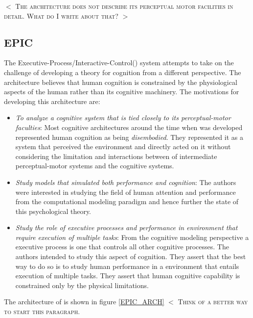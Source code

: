$<$ \textsc{The \soar architecture does not describe its perceptual
  motor facilities in detail. What do I write about that?} $>$


\subsection{EPIC}
The Executive-Process/Interactive-Control(\epic) system attempts to
take on the challenge of developing a theory for cognition from a
different perspective. The \epic architecture believes that human
cognition is constrained by the physiological aspects of the human
rather than its cognitive machinery. The motivations for developing
this architecture are:

\begin{itemize}
\item \emph{To analyze a cognitive system that is tied closely to its
    perceptual-motor faculties}: Most cognitive architectures around
  the time when \epic was developed represented human cognition as
  being \emph{disembodied}. They represented it as a system that
  perceived the environment and directly acted on it without
  considering the limitation and interactions between of intermediate
  perceptual-motor systems and the cognitive systems.
\item \emph{Study models that simulated both performance and
    cognition}: The authors were interested in studying the field of
  human attention and performance from the computational modeling
  paradigm and hence further the state of this psychological theory.
\item \emph{Study the role of executive processes and performance in
    environment that require execution of multiple tasks}: From the
  cognitive modeling perspective a executive process is one that
  controls all other cognitive processes. The authors intended to
  study this aspect of  cognition. They assert that the
  best way to do so is to study human performance in a environment
  that entails execution of multiple tasks. They assert that human
  cognitive capability is constrained only by the physical
  limitations.  
\end{itemize}

The architecture of \epic is shown in figure \ref{EPIC_ARCH} $<$
\textsc{Think of a better way to start this paragraph}.

